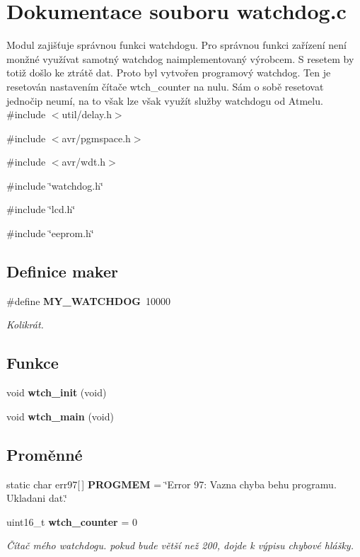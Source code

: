 \section{Dokumentace souboru watchdog.c}
\label{watchdog_8c}


Modul zajišťuje správnou funkci watchdogu. Pro správnou funkci zařízení není monžné využívat samotný watchdog naimplementovaný výrobcem. S resetem by totiž došlo ke ztrátě dat. Proto byl vytvořen programový watchdog. Ten je resetován nastavením čítače wtch\_\-counter na nulu. Sám o sobě resetovat jednočip neumí, na to však lze však využít služby watchdogu od Atmelu.  
{\ttfamily \#include $<$util/delay.h$>$}\par
{\ttfamily \#include $<$avr/pgmspace.h$>$}\par
{\ttfamily \#include $<$avr/wdt.h$>$}\par
{\ttfamily \#include \char`\"{}watchdog.h\char`\"{}}\par
{\ttfamily \#include \char`\"{}lcd.h\char`\"{}}\par
{\ttfamily \#include \char`\"{}eeprom.h\char`\"{}}\par
\subsection*{Definice maker}
\begin{DoxyCompactItemize}
\item 
\#define {\bf MY\_\-WATCHDOG}~10000
\begin{DoxyCompactList}\small\item\em Kolikrát. \item\end{DoxyCompactList}\end{DoxyCompactItemize}
\subsection*{Funkce}
\begin{DoxyCompactItemize}
\item 
void {\bf wtch\_\-init} (void)
\item 
void {\bf wtch\_\-main} (void)
\end{DoxyCompactItemize}
\subsection*{Proměnné}
\begin{DoxyCompactItemize}
\item 
static char err97[$\,$] {\bf PROGMEM} = \char`\"{}Error 97: Vazna chyba behu programu. Ukladani dat.\char`\"{}
\item 
uint16\_\-t {\bf wtch\_\-counter} = 0
\begin{DoxyCompactList}\small\item\em Čítač mého watchdogu. pokud bude větší než 200, dojde k výpisu chybové hlášky. \item\end{DoxyCompactList}\end{DoxyCompactItemize}


